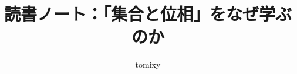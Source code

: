 \documentclass[b5paper,17pt,twocolumn]{jsarticle}
\title{読書ノート：「集合と位相」をなぜ学ぶのか}
\author{tomixy}
\begin{document}
\maketitle
\tableofcontents

\br



\end{document}
